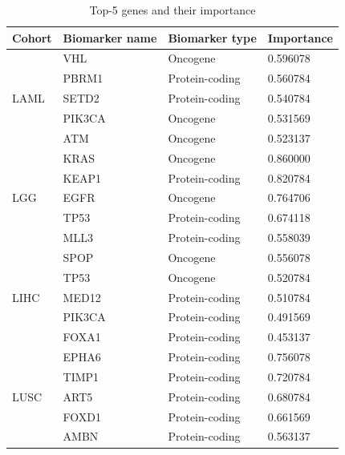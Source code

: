 \begin{table}
    \caption{Top-5 genes and their importance}
    \label{table:proteinimportance_2} %
    \begin{center}
    \scriptsize{
    \vspace{-6mm}
    \begin{tabular}{l|l|l|l}
        \toprule
        \textbf{Cohort} & \textbf{Biomarker name} & \textbf{Biomarker type} & \textbf{Importance} \\ 
        \midrule
        \multirow{5}{*}{LAML} & VHL & Oncogene & 0.596078 \\ %
        & PBRM1 & Protein-coding  & 0.560784 \\ %
        & SETD2 & Protein-coding & 0.540784 \\ %
        & PIK3CA & Oncogene & 0.531569 \\ %
        & ATM & Oncogene & 0.523137 \\ %
        \midrule
        \multirow{5}{*}{LGG}& KRAS & Oncogene & 0.860000 \\ %
        & KEAP1 & Protein-coding & 0.820784 \\ %
        & EGFR & Oncogene & 0.764706 \\ %
        & TP53 & Protein-coding & 0.674118 \\ %
        & MLL3 & Protein-coding & 0.558039 \\ %
        \midrule
        \multirow{5}{*}{LIHC}& SPOP & Oncogene & 0.556078 \\ %
        & TP53 & Oncogene & 0.520784 \\ %
        & MED12 & Protein-coding & 0.510784 \\ %
        & PIK3CA & Protein-coding & 0.491569 \\ %
        & FOXA1 & Protein-coding & 0.453137 \\ %
        \midrule
        \multirow{5}{*}{LUSC}& EPHA6 & Protein-coding & 0.756078 \\ %
        & TIMP1 & Protein-coding & 0.720784 \\ %
        & ART5 & Protein-coding & 0.680784 \\ %
        & FOXD1 & Protein-coding & 0.661569 \\ %
        & AMBN & Protein-coding & 0.563137 \\ %

\end{tabular}}
\end{center}
\end{table}
